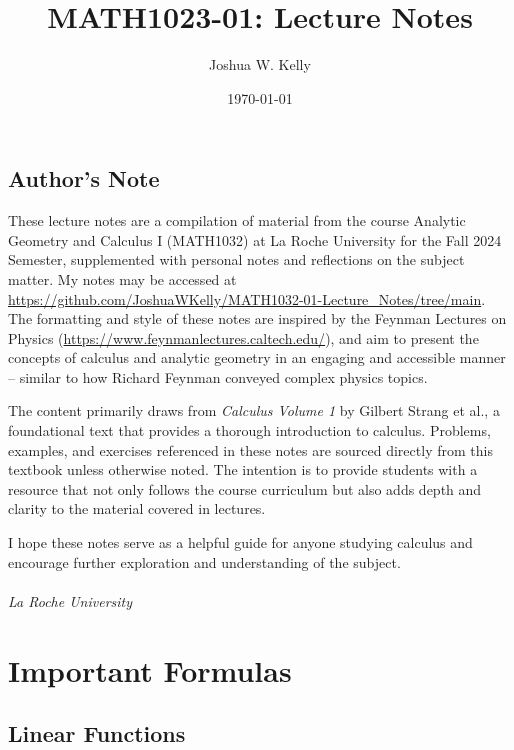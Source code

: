 \documentclass{book}
\title{MATH1023-01: Lecture Notes} %
\author{Joshua W. Kelly} %
\date{\today} %
\begin{document}
\maketitle %


\section*{Author's Note} %
These lecture notes are a compilation of material from the course Analytic Geometry and Calculus I (MATH1032) at La Roche University for the Fall 2024 Semester, supplemented with personal notes and reflections on the subject matter. My notes may be accessed at \\ \url{https://github.com/JoshuaWKelly/MATH1032-01-Lecture_Notes/tree/main}. The formatting and style of these notes are inspired by the Feynman Lectures on Physics (\url{https://www.feynmanlectures.caltech.edu/}), and aim to present the concepts of calculus and analytic geometry in an engaging and accessible manner -- similar to how Richard Feynman conveyed complex physics topics.

The content primarily draws from \textit{Calculus Volume 1} by Gilbert Strang et al.\cite{strang_calculus_2016}, a foundational text that provides a thorough introduction to calculus. Problems, examples, and exercises referenced in these notes are sourced directly from this textbook unless otherwise noted. The intention is to provide students with a resource that not only follows the course curriculum but also adds depth and clarity to the material covered in lectures.

I hope these notes serve as a helpful guide for anyone studying calculus and encourage further exploration and understanding of the subject.\\

 \\
\textit{La Roche University} \\ 

\tableofcontents %

\newpage

\chapter{Important Formulas} %
\section{Linear Functions}
\end{document}
